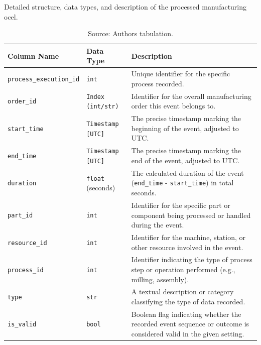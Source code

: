 \begin{table}[htbp]
  \centering
  \caption[Illustrative Manufacturing OCEL]{Detailed structure, data types, and description of the processed manufacturing \gls{ocel}.}
  \label{tab:output-structure-detailed}
  \begin{tabular}{l l p{6cm}} %
    \toprule
    \textbf{Column Name}            & \textbf{Data Type}       & \textbf{Description}                                                                                             \\
    \midrule
    \texttt{process\_execution\_id} & \texttt{int}             & Unique identifier for the specific process recorded.                                                             \\
    \texttt{order\_id}              & \texttt{Index (int/str)} & Identifier for the overall manufacturing order this event belongs to.                                            \\
    \texttt{start\_time}            & \texttt{Timestamp [UTC]} & The precise timestamp marking the beginning of the event, adjusted to UTC.                                       \\
    \texttt{end\_time}              & \texttt{Timestamp [UTC]} & The precise timestamp marking the end of the event, adjusted to UTC.                                             \\
    \texttt{duration}               & \texttt{float} (seconds) & The calculated duration of the event (\texttt{end\_time} - \texttt{start\_time}) in total seconds.               \\
    \texttt{part\_id}               & \texttt{int}             & Identifier for the specific part or component being processed or handled during the event.                       \\
    \texttt{resource\_id}           & \texttt{int}             & Identifier for the machine, station, or other resource involved in the event.                                    \\
    \texttt{process\_id}            & \texttt{int}             & Identifier indicating the type of process step or operation performed (e.g., milling, assembly).                 \\
    \texttt{type}                   & \texttt{str}             & A textual description or category classifying the type of data recorded.                                         \\
    \texttt{is\_valid}              & \texttt{bool}            & Boolean flag indicating whether the recorded event sequence or outcome is considered valid in the given setting. \\
    \bottomrule
  \end{tabular}
  \caption*{Source: Authors tabulation.}
\end{table}

